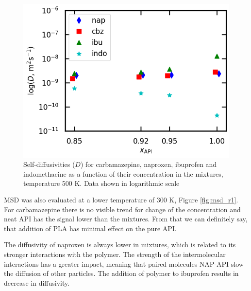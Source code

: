 \begin{figure}[htb!]
	\centering
	\includegraphics[width=0.6\linewidth]{img/d.png} 
	\caption{Self-diffusivities ($D$) for carbamazepine, naproxen, ibuprofen and indomethacine as a function of their concentration in the mixtures, temperature 500 K. Data shown in logarithmic scale}
	\label{fig:d}    
\end{figure}  

MSD was also evaluated at a lower temperature of 300 K, Figure \ref{fig:msd_r1}. For carbamazepine there is no visible trend for change of the concentration and neat API has the signal lower than the mixtures. From that we can definitely say, that addition of PLA has minimal effect on the pure API.

The diffusivity of naproxen is always lower in mixtures, which is related to its stronger interactions with the polymer. The strength of the intermolecular interactions has a greater impact, meaning that paired molecules NAP-API slow the diffusion of other particles. The addition of polymer to ibuprofen results in decrease in diffusivity. 

